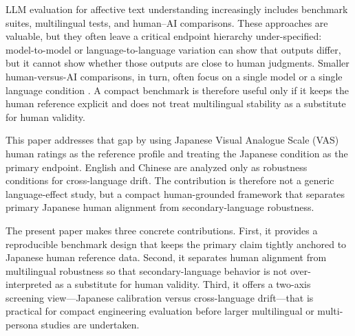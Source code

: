 LLM evaluation for affective text understanding increasingly includes benchmark suites, multilingual tests, and human--AI comparisons. These approaches are valuable, but they often leave a critical endpoint hierarchy under-specified: model-to-model or language-to-language variation can show that outputs differ, but it cannot show whether those outputs are close to human judgments. Smaller human-versus-AI comparisons, in turn, often focus on a single model or a single language condition \cite{shirahama2025vas,paech2024eqbench,huang2024emotionbench}. A compact benchmark is therefore useful only if it keeps the human reference explicit and does not treat multilingual stability as a substitute for human validity.

This paper addresses that gap by using Japanese Visual Analogue Scale (VAS) human ratings as the reference profile and treating the Japanese condition as the primary endpoint. English and Chinese are analyzed only as robustness conditions for cross-language drift. The contribution is therefore not a generic language-effect study, but a compact human-grounded framework that separates primary Japanese human alignment from secondary-language robustness.

The present paper makes three concrete contributions. First, it provides a reproducible benchmark design that keeps the primary claim tightly anchored to Japanese human reference data. Second, it separates human alignment from multilingual robustness so that secondary-language behavior is not over-interpreted as a substitute for human validity. Third, it offers a two-axis screening view---Japanese calibration versus cross-language drift---that is practical for compact engineering evaluation before larger multilingual or multi-persona studies are undertaken.
